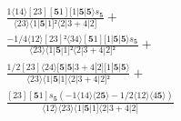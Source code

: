 \documentclass[varwidth, border=5pt]{standalone}
\begin{document}
\begin{my}
$\begin{gathered}
\scriptscriptstyle\frac{1⟨14⟩[23][𝟓1][1|𝟓|𝟓⟩s_{𝟓}}{⟨23⟩⟨1|𝟓|1]²⟨2|3+4|2]} +\\
\scriptscriptstyle\frac{-1/4⟨12⟩[23]²⟨34⟩[𝟓1][1|𝟓|𝟓⟩s_{𝟓}}{⟨23⟩⟨1|𝟓|1]²⟨2|3+4|2]²} +\\
\scriptscriptstyle\frac{1/2[23]⟨24⟩[𝟓|𝟓|3+4|2][1|𝟓|𝟓⟩}{⟨23⟩⟨1|𝟓|1]⟨2|3+4|2]²} +\\
\scriptscriptstyle\frac{[23][𝟓1]s_{𝟓}(-1⟨14⟩⟨2𝟓⟩-1/2⟨12⟩⟨4𝟓⟩)}{⟨12⟩⟨23⟩⟨1|𝟓|1]⟨2|3+4|2]} \phantom{+}
\end{gathered}$
\end{my}
\end{document}
